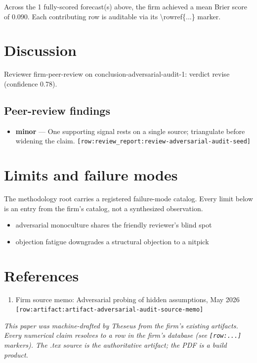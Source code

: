 \documentclass[11pt,letterpaper]{article}
\newcommand{\rowref}[1]{\texttt{\small[row:#1]}}
\begin{document}
Across the 1 fully-scored forecast(s) above, the firm achieved a mean Brier score of 0.090. Each contributing row is auditable via its \textbackslash{}rowref\{...\} marker.
\section{Discussion}
Reviewer firm-peer-review on conclusion-adversarial-audit-1: verdict revise (confidence 0.78).
\subsection*{Peer-review findings}
\begin{itemize}[leftmargin=1.5em]
  \item \textbf{minor} --- One supporting signal rests on a single source; triangulate before widening the claim.
        \rowref{review\_report:review-adversarial-audit-seed}
\end{itemize}
\section{Limits and failure modes}
The methodology root carries a registered failure-mode catalog. Every
limit below is an entry from the firm's catalog, not a synthesized
observation.

\begin{itemize}[leftmargin=1.5em]
  \item adversarial monoculture shares the friendly reviewer's blind spot
  \item objection fatigue downgrades a structural objection to a nitpick
\end{itemize}
\section{References}
\begin{enumerate}[leftmargin=2em]
  \item Firm source memo: Adversarial probing of hidden assumptions, May 2026 \rowref{artifact:artifact-adversarial-audit-source-memo}
\end{enumerate}

\vfill
\begin{center}\small
\textit{This paper was machine-drafted by Theseus from the firm's existing
artifacts. Every numerical claim resolves to a row in the firm's
database (see \rowref{...} markers). The .tex source is the authoritative
artifact; the PDF is a build product.}
\end{center}
\end{document}
